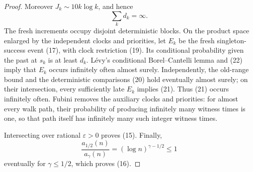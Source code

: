 \begin{proof}
Moreover \(J_k\sim10k\log k\), and hence
\begin{equation}
\sum_kd_k=\infty.                                      \tag{22}
\end{equation}
The fresh increments occupy disjoint deterministic blocks.  On the product
space enlarged by the independent clocks and priorities, let \(E_k\)
be the fresh singleton-success event (17), with clock restriction (19).
Its conditional probability given the past at \(s_k\) is at least
\(d_k\).  Lévy's conditional Borel--Cantelli lemma and (22) imply that
\(E_k\) occurs infinitely often almost surely.  Independently, the
old-range bound and the deterministic comparisons (20) hold eventually
almost surely; on their intersection, every sufficiently late \(E_k\)
implies (21).  Thus (21) occurs infinitely often.  Fubini removes the
auxiliary clocks and priorities: for almost every walk path, their
probability of producing infinitely many witness times is one, so that
path itself has infinitely many such integer witness times.

Intersecting over rational \(\varepsilon>0\) proves (15).  Finally,
\[
       \frac{a_{1/2}(n)}{a_\gamma(n)}
       =(\log n)^{\gamma-1/2}\le1
\]
eventually for \(\gamma\le1/2\), which proves (16).
\end{proof}
